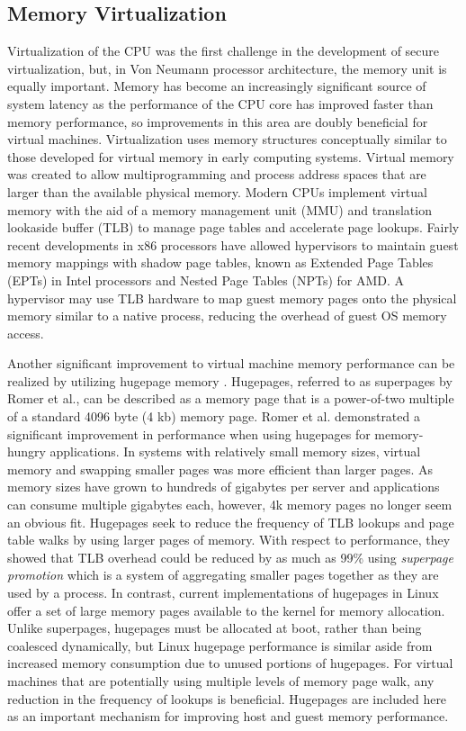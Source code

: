 \subsection{Memory Virtualization}
\label{sec:vt_memory}
Virtualization of the CPU was the first challenge in the development of secure virtualization, but, in Von Neumann processor architecture, the memory unit is equally important.
Memory has become an increasingly significant source of system latency as the performance of the CPU core has improved faster than memory performance, so improvements in this area are doubly beneficial for virtual machines.
Virtualization uses memory structures conceptually similar to those developed for virtual memory in early computing systems.
Virtual memory was created to allow multiprogramming and process address spaces that are larger than the available physical memory.
Modern CPUs implement virtual memory with the aid of a memory management unit (MMU) and translation lookaside buffer (TLB) to manage page tables and accelerate page lookups.
Fairly recent developments in x86 processors have allowed hypervisors to maintain guest memory mappings with shadow page tables, known as Extended Page Tables (EPTs) in Intel processors and Nested Page Tables (NPTs) for AMD.
A hypervisor may use TLB hardware to map guest memory pages onto the physical memory similar to a native process, reducing the overhead of guest OS memory access.

Another significant improvement to virtual machine memory performance can be realized by utilizing hugepage memory \autocite{_romer_1}.
Hugepages, referred to as superpages by Romer et al., can be described as a memory page that is a power-of-two multiple of a standard 4096 byte (4 kb) memory page.
Romer et al. demonstrated a significant improvement in performance when using hugepages for memory-hungry applications.
In systems with relatively small memory sizes, virtual memory and swapping smaller pages was more efficient than larger pages.
As memory sizes have grown to hundreds of gigabytes per server and applications can consume multiple gigabytes each, however, 4k memory pages no longer seem an obvious fit.
Hugepages seek to reduce the frequency of TLB lookups and page table walks by using larger pages of memory.
With respect to performance, they showed that TLB overhead could be reduced by as much as 99\% using \emph{superpage promotion} which is a system of aggregating smaller pages together as they are used by a process.
In contrast, current implementations of hugepages in Linux offer a set of large memory pages available to the kernel for memory allocation.
Unlike superpages, hugepages must be allocated at boot, rather than being coalesced dynamically, but Linux hugepage performance is similar aside from increased memory consumption due to unused portions of hugepages.
For virtual machines that are potentially using multiple levels of memory page walk, any reduction in the frequency of lookups is beneficial.
Hugepages are included here as an important mechanism for improving host and guest memory performance.

